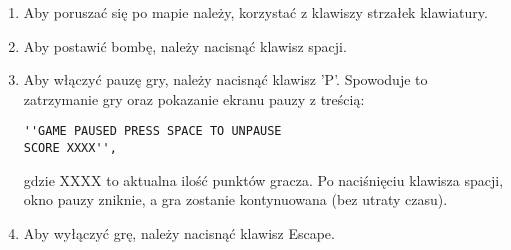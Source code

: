 \documentclass[12pt,a4paper]{article}
\begin{document}
 \begin{enumerate}
\item Aby poruszać się po mapie należy, korzystać z klawiszy strzałek klawiatury.
\item Aby postawić bombę, należy nacisnąć klawisz spacji.
\item Aby włączyć pauzę gry, należy nacisnąć klawisz 'P'. Spowoduje to zatrzymanie gry oraz pokazanie ekranu pauzy z treścią:
\begin{verbatim}
''GAME PAUSED PRESS SPACE TO UNPAUSE 
SCORE XXXX'', 
\end{verbatim}
gdzie XXXX to aktualna ilość punktów gracza. Po naciśnięciu klawisza spacji, okno pauzy zniknie, a gra zostanie kontynuowana (bez utraty czasu).
\item Aby wyłączyć grę, należy nacisnąć klawisz Escape.
\end{enumerate}
\end{document}
